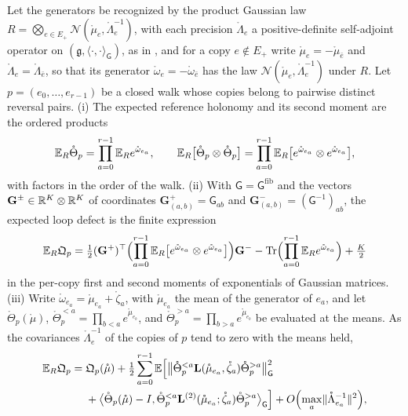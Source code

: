 Let the generators be recognized by the product Gaussian law
\(R=\bigotimes_{e\in E_+}\mathcal N(\mathring\mu_e,\mathring\Lambda_e^{-1})\), with each precision
\(\mathring\Lambda_e\) a positive-definite self-adjoint operator on
\((\mathfrak g,\langle\cdot,\cdot\rangle_{\mathsf G})\), as in , and
for a copy \(e\notin E_+\) write \(\mathring\mu_e=-\mathring\mu_{\bar e}\) and
\(\mathring\Lambda_e=\mathring\Lambda_{\bar e}\), so that its generator \(\mathring\omega_e=-\mathring\omega_{\bar e}\)
has the law \(\mathcal N(\mathring\mu_e,\mathring\Lambda_e^{-1})\) under \(R\). Let \(p=(e_0,\ldots,e_{r-1})\) be
a closed walk whose copies belong to pairwise distinct reversal pairs. (i) The expected reference
holonomy and its second moment are the ordered products
\begin{equation}
\mathbb E_R\mathring\Theta_p=\prod_{a=0}^{r-1}\mathbb E_Re^{\mathring\omega_{e_a}},
\qquad
\mathbb E_R\bigl[\mathring\Theta_p\otimes\mathring\Theta_p\bigr]
=\prod_{a=0}^{r-1}\mathbb E_R\bigl[e^{\mathring\omega_{e_a}}\otimes e^{\mathring\omega_{e_a}}\bigr],
\label{eq:glink-loop-moments}
\end{equation}
with factors in the order of the walk. (ii) With \(\mathsf G=\mathsf G^{\mathrm{fib}}\) and the vectors
\(\mathbf G^\pm\in\mathbb R^K\otimes\mathbb R^K\) of coordinates \(\mathbf G^+_{(a,b)}=\mathsf G_{ab}\) and
\(\mathbf G^-_{(a,b)}=(\mathsf G^{-1})_{ab}\), the expected loop defect is the finite expression
\begin{equation}
\mathbb E_R\mathfrak Q_p
=\tfrac12(\mathbf G^+)^\top\Bigl(\prod_{a=0}^{r-1}\mathbb E_R\bigl[e^{\mathring\omega_{e_a}}\otimes e^{\mathring\omega_{e_a}}\bigr]\Bigr)\mathbf G^-
-\operatorname{Tr}\Bigl(\prod_{a=0}^{r-1}\mathbb E_Re^{\mathring\omega_{e_a}}\Bigr)+\tfrac K2
\label{eq:glink-expected-defect}
\end{equation}
in the per-copy first and second moments of exponentials of Gaussian matrices.
(iii) Write \(\mathring\omega_{e_a}=\mathring\mu_{e_a}+\mathring\zeta_a\), with \(\mathring\mu_{e_a}\) the mean of
the generator of \(e_a\), and let \(\mathring\Theta_p(\mathring\mu)\),
\(\mathring\Theta^{<a}_p=\prod_{b<a}e^{\mathring\mu_{e_b}}\), and
\(\mathring\Theta^{>a}_p=\prod_{b>a}e^{\mathring\mu_{e_b}}\) be evaluated at the means. As the covariances
\(\mathring\Lambda_e^{-1}\) of the copies of \(p\) tend to zero with the means held,
\begin{equation}
\begin{aligned}
\mathbb E_R\mathfrak Q_p={}&\mathfrak Q_p(\mathring\mu)
+\tfrac12\sum_{a=0}^{r-1}\mathbb E\Bigl[\bigl\lVert\mathring\Theta^{<a}_p\mathbf L(\mathring\mu_{e_a},\mathring\zeta_a)\mathring\Theta^{>a}_p\bigr\rVert_{\mathsf G}^2\\
&+\bigl\langle\mathring\Theta_p(\mathring\mu)-I,\mathring\Theta^{<a}_p\mathbf L^{(2)}(\mathring\mu_{e_a};\mathring\zeta_a)\mathring\Theta^{>a}_p\bigr\rangle_{\mathsf G}\Bigr]
+O\Bigl(\max_a\lVert\mathring\Lambda_{e_a}^{-1}\rVert^2\Bigr),
\end{aligned}
\label{eq:glink-defect-first-order}
\end{equation}
